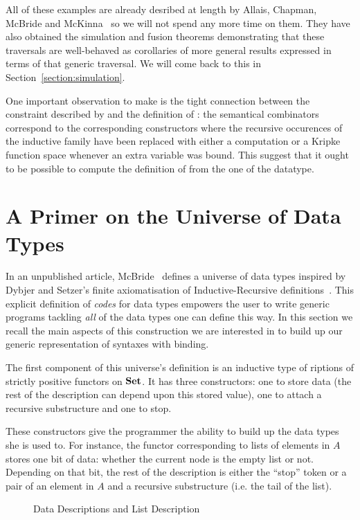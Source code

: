 All of these examples are already desribed at length by Allais, Chapman,
McBride and McKinna~\citeyear{allais2017type} so we will not spend any
more time on them. They have also obtained the simulation and fusion
theorems demonstrating that these traversals are well-behaved as
corollaries of more general results expressed in terms of that generic
traversal. We will come back to this in Section~\ref{section:simulation}.

One important observation to make is the tight connection between the
constraint described by  and the definition of : the
semantical combinators correspond to the corresponding constructors
where the recursive occurences of the inductive family have been replaced
with either a computation or a Kripke function space whenever an
extra variable was bound. This suggest that it ought to be possible
to compute the definition of  from the one of the datatype.

\section{A Primer on the Universe of Data Types}

In an unpublished article, McBride~\citeyear{mcbride2010ornamental}
defines a universe of data types inspired by Dybjer and Setzer's
finite axiomatisation of Inductive-Recursive definitions~\citeyear{Dybjer1999}.
This explicit definition of \emph{codes} for data types empowers the
user to write generic programs tackling \emph{all} of the data types
one can define this way. In this section we recall the main aspects
of this construction we are interested in to build up our generic
representation of syntaxes with binding.

The first component of this universe's definition is an inductive type
of riptions of strictly positive functors on $\mathbf{Set}{}$. It has
three constructors: one to store data (the rest of the description can
depend upon this stored value), one to attach a recursive substructure
and one to stop.

These constructors give the programmer the ability to build up the data
types she is used to. For instance, the functor corresponding to lists
of elements in $A$ stores one bit of data: whether the current node is
the empty list or not. Depending on that bit, the rest of the description
is either the ``stop'' token or a pair of an element in $A$ and a
recursive substructure (i.e. the tail of the list).

\begin{figure}[h]
\begin{minipage}{0.45\textwidth}
\end{minipage}\hspace{2em}
\begin{minipage}{0.45\textwidth}
\end{minipage}
\caption{Data Descriptions and List Description}
\end{figure}

